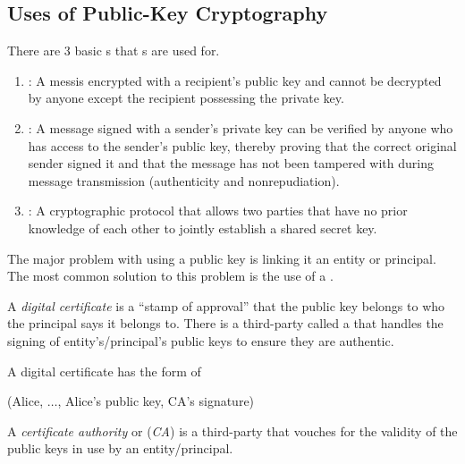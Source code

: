 \subsection{Uses of Public-Key Cryptography}\label{subsec:Uses_Public_Key_Cryptography}
There are 3 basic s that s are used for.
\begin{enumerate}[noitemsep]
\item {}: A messis encrypted with a recipient’s public key and cannot be decrypted by anyone except the recipient possessing the private key.
\item {}: A message signed with a sender’s private key can be verified by anyone who has access to the sender’s public key, thereby proving that the correct original sender signed it and that the message has not been tampered with during message transmission (authenticity and nonrepudiation).
\item {}: A cryptographic protocol that allows two parties that have no prior knowledge of each other to jointly establish a shared secret key.
\end{enumerate}

The major problem with using a public key is linking it an entity or principal.
The most common solution to this problem is the use of a .

\begin{definition}\label{def:Digital_Certificate}
  A \emph{digital certificate} is a ``stamp of approval'' that the public key belongs to who the principal says it belongs to.
  There is a third-party called a  that handles the signing of entity's/principal's public keys to ensure they are authentic.

  A digital certificate has the form of
  \begin{center}
    (Alice, $\ldots$, Alice's public key, CA's signature)
  \end{center}
\end{definition}

\begin{definition}\label{def:Certificate_Authority}
  A \emph{certificate authority} or (\emph{CA}) is a third-party that vouches for the validity of the public keys in use by an entity/principal.
\end{definition}

